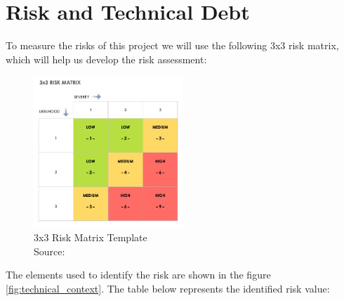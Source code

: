 \section{Risk and Technical Debt}

To measure the risks of this project we will use the following 3x3 risk matrix, which will help us develop the 
\gls{risk assessment}:

\begin{figure}[H]
    \centering
    \includegraphics[width=0.5\textwidth]{assets/Risk-Matrix.png}
    \caption{3x3 Risk Matrix Template\\ Source: \citet{refonline:smtrisk}  }
    \label{fig:risk_matrix_template}
\end{figure}

The elements used to identify the risk are shown in the figure \ref{fig:technical_context}. The table below represents
the identified risk value:

